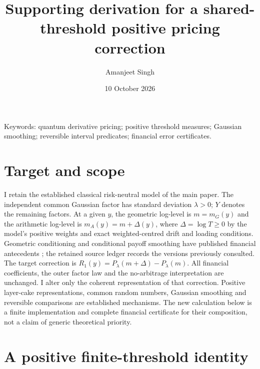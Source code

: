 \documentclass[11pt]{article}
\title{Supporting derivation for a shared-threshold positive pricing correction}
\author{Amanjeet Singh}
\date{10 October 2026}
\begin{document}
\maketitle
\noindent Keywords: quantum derivative pricing; positive threshold measures;
Gaussian smoothing; reversible interval predicates; financial error certificates.

\section{Target and scope}

I retain the established classical risk-neutral model of the main paper.
The independent common Gaussian factor has standard deviation $\lambda>0$;
$Y$ denotes the remaining factors. At a given $y$, the geometric log-level
is $m=m_G(y)$ and the arithmetic log-level is
$m_A(y)=m+\Delta(y)$, where $\Delta=\log T\geq0$ by the model's positive
weights and exact weighted-centred drift and loading conditions.
Geometric conditioning and conditional payoff smoothing have published
financial antecedents \citep{curran,bayer}; the retained source ledger
records the versions previously consulted.
The target correction is $R_1(y)=P_\lambda(m+\Delta)-P_\lambda(m)$.
All financial coefficients, the outer factor law and the no-arbitrage
interpretation are unchanged. I alter only the coherent representation of
that correction. Positive layer-cake representations, common random
numbers, Gaussian smoothing and reversible comparisons are established
mechanisms. The new calculation below is a finite implementation and
complete financial certificate for their composition, not a claim of
generic theoretical priority.

\section{A positive finite-threshold identity}
\end{document}

